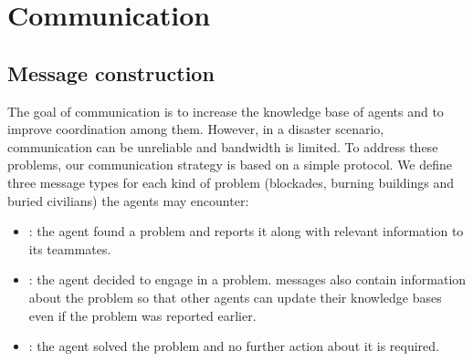 \section{Communication}
\label{sec:communication}

\subsection{Message construction}
\label{sec:msg}
The goal of communication is to increase the knowledge base of agents and to improve coordination among them. However, in a disaster scenario, communication can be unreliable and bandwidth is limited. To address these problems, our communication strategy is based on a simple protocol. We define three message types for each kind of problem (blockades, burning buildings and buried civilians) the agents may encounter:

\begin{itemize}
 \item {}: the agent found a problem and reports it along with relevant information to its teammates. %

 \item {}: the agent decided to engage in a problem.  messages also contain information about the problem so that other agents can update their knowledge bases even if the problem was reported earlier.

 \item {}: the agent solved the problem and no further action about it is required. %
\end{itemize}



